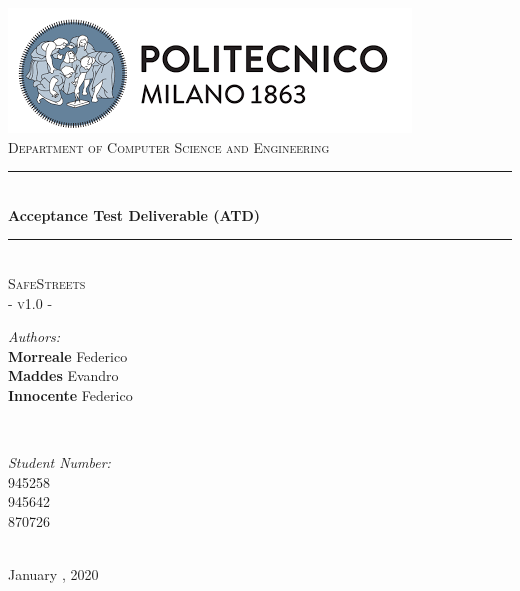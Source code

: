 \documentclass[a4paper, hidelinks, 12pt]{report}
\begin{document}
    \begin{titlepage}
        \centering
        \vspace*{0.7 cm}
        \includegraphics[scale = 0.85]{assets/polimi.png}\\[1.6 cm]
        \textsc{\large Department of Computer Science and Engineering}\\[1.8 cm]

        \rule{\linewidth}{0.2 mm} \\[0.4 cm]
        { \huge \bfseries Acceptance Test Deliverable (ATD)}\\
        \rule{\linewidth}{0.2 mm} \\[1.5 cm]

        \textsc{\Large SafeStreets}\\[0.5 cm]
        \textsc{\large - v1.0 -}\\[1 cm]

        \begin{minipage}{0.4\textwidth}
            \begin{flushleft}
                \large
                \emph{Authors:}\\
                \textbf{Morreale} Federico \\
                \textbf{Maddes} Evandro \\
                \textbf{Innocente} Federico
            \end{flushleft}
        \end{minipage}~
        \begin{minipage}{0.4\textwidth}
            \begin{flushright}
                \large
                \emph{Student Number:} \\
                945258 \\
                945642 \\
                870726
            \end{flushright}
        \end{minipage}\\[2 cm]


        {\large January  , 2020}\\[2 cm]

        \vfill
    \end{titlepage}

    \tableofcontents
    \newpage
    \listoftables
    \clearpage
    \setcounter{page}{1}

    \newpage
    
    
    
\end{document}
